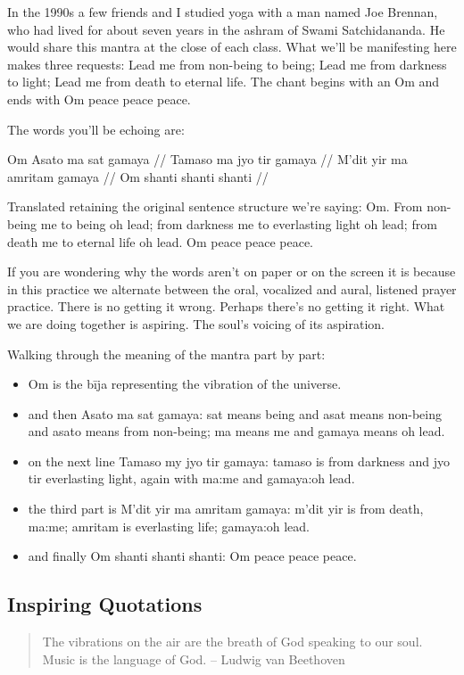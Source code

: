 \documentclass[12pt]{article}
\begin{document}
In the 1990s a few friends and I studied yoga with a man named Joe Brennan, who had lived for about seven years in the ashram of Swami Satchidananda. He would share this mantra at the close of each class. What we'll be manifesting here makes three requests: Lead me from non-being to being; Lead me from darkness to light; Lead me from death to eternal life. The chant begins with an Om and ends with Om peace peace peace.

The words you'll be echoing are:

Om Asato ma sat gamaya //
Tamaso ma jyo tir gamaya //
M'dit yir ma amritam gamaya //
Om shanti shanti shanti //

Translated retaining the original sentence structure we're saying: Om. From non-being me to being oh lead; from darkness me to everlasting light oh lead; from death me to eternal life oh lead. Om peace peace peace.

If you are wondering why the words aren't on paper or on the screen it is because in this practice we alternate between the oral, vocalized and aural, listened prayer practice. There is no getting it wrong. Perhaps there's no getting it right. What we are doing together is aspiring. The soul's voicing of its aspiration.

Walking through the meaning of the mantra part by part:

\begin{itemize}
  \item Om is the bīja representing the vibration of the universe.
  \item and then Asato ma sat gamaya: sat means being and asat means non-being and asato means from non-being; ma means me and gamaya means oh lead.
  \item on the next line Tamaso my jyo tir gamaya: tamaso is from darkness and jyo tir everlasting light, again with ma:me and gamaya:oh lead.
  \item the third part is M'dit yir ma amritam gamaya: m'dit yir is from death, ma:me; amritam is everlasting life; gamaya:oh lead.
  \item and finally Om shanti shanti shanti: Om peace peace peace.
\end{itemize}

\subsection*{Inspiring Quotations}

\begin{quote}
  The vibrations on the air are the breath of God speaking to our soul. Music is the language of God. – Ludwig van Beethoven
\end{quote}
\end{document}
